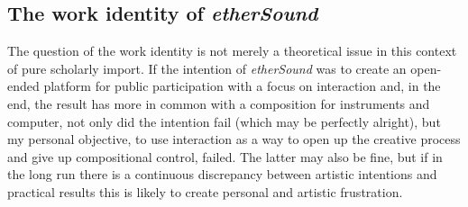 
\subsection{The work identity of \emph{etherSound}}
\label{sec:ident-emph}

The question of the work identity is not merely a theoretical issue in this context of pure scholarly import. If the intention of \emph{etherSound} was to create an open-ended platform for public participation with a focus on interaction and, in the end, the result has more in common with a composition for instruments and computer, not only did the intention fail (which may be perfectly alright), but my personal objective, to use interaction as a way to open up the creative process and give up compositional control, failed. The latter may also be fine, but if in the long run there is a continuous discrepancy between artistic intentions and practical results this is likely to create personal and artistic frustration. 

